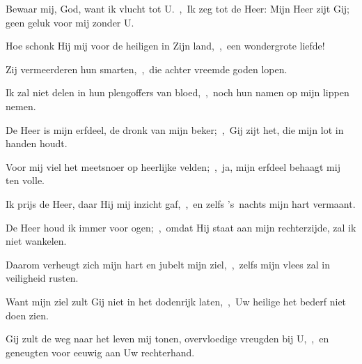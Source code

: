 \documentclass[12pt,twoside,a5paper]{article}
\begin{document}
\begin{halfparskip}
   Bewaar mij, God, want ik vlucht tot U.~\sep\ Ik zeg tot de Heer: Mijn Heer zijt Gij; geen geluk voor mij zonder U.

  Hoe schonk Hij mij voor de heiligen in Zijn land,~\sep\ een wondergrote liefde!

  Zij vermeerderen hun smarten,~\sep\ die achter vreemde goden lopen.

  Ik zal niet delen in hun plengoffers van bloed,~\sep\ noch hun namen op mijn lippen nemen.

  De Heer is mijn erfdeel, de dronk van mijn beker;~\sep\ Gij zijt het, die mijn lot in handen houdt.

  Voor mij viel het meetsnoer op heerlijke velden;~\sep\ ja, mijn erfdeel behaagt mij ten volle.

  Ik prijs de Heer, daar Hij mij inzicht gaf,~\sep\ en zelfs 's~nachts mijn hart vermaant.

  De Heer houd ik immer voor ogen;~\sep\ omdat Hij staat aan mijn rechterzijde, zal ik niet wankelen.

  Daarom verheugt zich mijn hart en jubelt mijn ziel,~\sep\ zelfs mijn vlees zal in veiligheid rusten.

  Want mijn ziel zult Gij niet in het dodenrijk laten,~\sep\ Uw heilige het bederf niet doen zien.

  Gij zult de weg naar het leven mij tonen, overvloedige vreugden bij U,~\sep\ en geneugten voor eeuwig aan Uw rechterhand.
\end{halfparskip}
\end{document}

